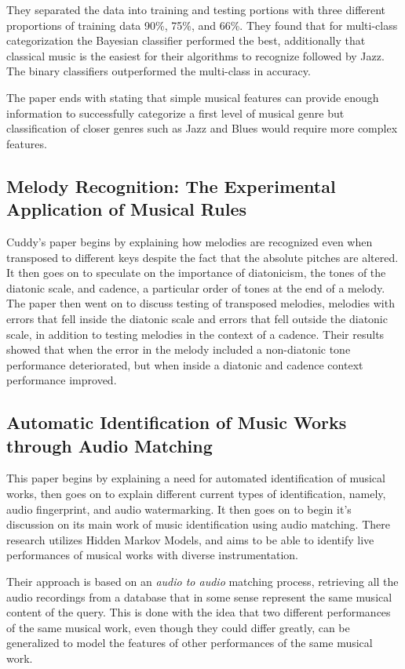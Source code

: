 \documentclass{article}
\begin{document}
	They separated the data into training and testing portions with three different proportions of training data 90\%, 75\%, and 66\%. They found that for multi-class categorization the Bayesian classifier performed the best, additionally that classical music is the easiest for their algorithms to recognize followed by Jazz. The binary classifiers outperformed the multi-class in accuracy. 
	
	The paper ends with stating that simple musical features can provide enough information to successfully categorize a first level of musical genre but classification of closer genres such as Jazz and Blues would require more complex features. 
	
	\subsection{Melody Recognition: The Experimental Application of Musical Rules}
	Cuddy's paper begins by explaining how melodies are recognized even when transposed to different keys despite the fact that the absolute pitches are altered. It then goes on to speculate on the importance of diatonicism, the tones of the diatonic scale, and cadence, a particular order of tones at the end of a melody. The paper then went on to discuss testing of transposed melodies, melodies with errors that fell inside the diatonic scale and errors that fell outside the diatonic scale, in addition to testing melodies in the context of a cadence. Their results showed that when the error in the melody included a non-diatonic tone performance deteriorated, but when inside a diatonic and cadence context performance improved. 
	
	\subsection{Automatic Identification of Music Works through Audio Matching}
	This paper begins by explaining a need for automated identification of musical works, then goes on to explain different current types of identification, namely, audio fingerprint, and audio watermarking. It then goes on to begin it's discussion on its main work of music identification using audio matching. There research utilizes Hidden Markov Models, and aims to be able to identify live performances of musical works with diverse instrumentation.
	
	Their approach is based on an \textit{audio to audio} matching process, retrieving all the audio recordings from a database that in some sense represent the same musical content of the query. This is done with the idea that two different performances of the same musical work, even though they could differ greatly, can be generalized to model the features of other performances of the same musical work.
	
\end{document}

